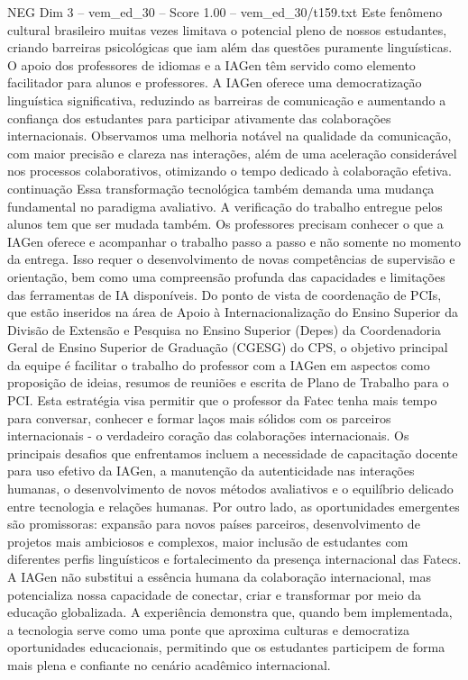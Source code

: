 \begin{textsample}{NEG Dim 3 – vem\_ed\_30 – Score 1.00 – vem\_ed\_30/t159.txt}
Este fenômeno cultural brasileiro muitas vezes limitava o potencial pleno de nossos estudantes, criando barreiras psicológicas que iam além das questões puramente linguísticas.
O apoio dos professores de idiomas e a IAGen têm servido como elemento facilitador para alunos e professores.
A IAGen oferece uma democratização linguística significativa, reduzindo as barreiras de comunicação e aumentando a confiança dos estudantes para participar ativamente das colaborações internacionais.
Observamos uma melhoria notável na qualidade da comunicação, com maior precisão e clareza nas interações, além de uma aceleração considerável nos processos colaborativos, otimizando o tempo dedicado à colaboração efetiva. continuação Essa transformação tecnológica também demanda uma mudança fundamental no paradigma avaliativo.
A verificação do trabalho entregue pelos alunos tem que ser mudada também.
Os professores precisam conhecer o que a IAGen oferece e acompanhar o trabalho passo a passo e não somente no momento da entrega.
Isso requer o desenvolvimento de novas competências de supervisão e orientação, bem como uma compreensão profunda das capacidades e limitações das ferramentas de IA disponíveis.
Do ponto de vista de coordenação de PCIs, que estão inseridos na área de Apoio à Internacionalização do Ensino Superior da Divisão de Extensão e Pesquisa no Ensino Superior (Depes) da Coordenadoria Geral de Ensino Superior de Graduação (CGESG) do CPS, o objetivo principal da equipe é facilitar o trabalho do professor com a IAGen em aspectos como proposição de ideias, resumos de reuniões e escrita de Plano de Trabalho para o PCI.
Esta estratégia visa permitir que o professor da Fatec tenha mais tempo para conversar, conhecer e formar laços mais sólidos com os parceiros internacionais - o verdadeiro coração das colaborações internacionais.
Os principais desafios que enfrentamos incluem a necessidade de capacitação docente para uso efetivo da IAGen, a manutenção da autenticidade nas interações humanas, o desenvolvimento de novos métodos avaliativos e o equilíbrio delicado entre tecnologia e relações humanas.
Por outro lado, as oportunidades emergentes são promissoras: expansão para novos países parceiros, desenvolvimento de projetos mais ambiciosos e complexos, maior inclusão de estudantes com diferentes perfis linguísticos e fortalecimento da presença internacional das Fatecs.
A IAGen não substitui a essência humana da colaboração internacional, mas potencializa nossa capacidade de conectar, criar e transformar por meio da educação globalizada.
A experiência demonstra que, quando bem implementada, a tecnologia serve como uma ponte que aproxima culturas e democratiza oportunidades educacionais, permitindo que os estudantes participem de forma mais plena e confiante no cenário acadêmico internacional.

\end{textsample}
